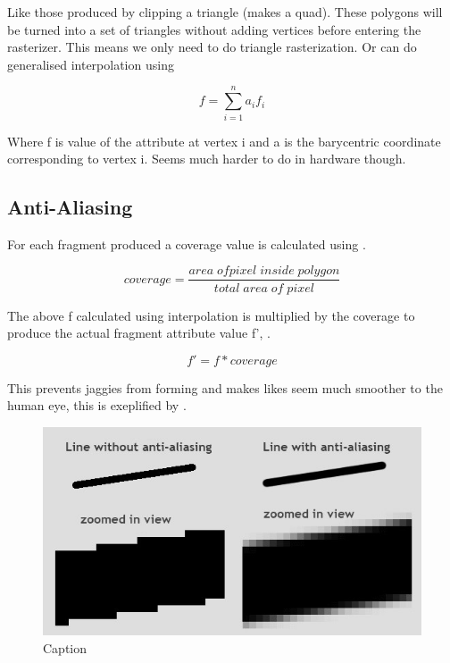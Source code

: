 Like those produced by clipping a triangle (makes a quad). These polygons will be turned into a set of triangles without adding vertices before entering the rasterizer. This means we only need to do triangle rasterization.
Or can do generalised interpolation using 

\begin{equation}\label{eqn:generalisedInterpolation}
    f = \sum_{i=1}^{n} a_if_i
\end{equation}

Where f is value of the attribute at vertex i and a is the barycentric coordinate corresponding to vertex i. 
Seems much harder to do in hardware though.

\subsection{Anti-Aliasing}
For each fragment produced a coverage value is calculated using .

\begin{equation}\label{eqn:aa-coverage}
    coverage = \frac{area \; of pixel \; inside \; polygon}{total \; area \; of \; pixel}
\end{equation}

The above f calculated using interpolation is multiplied by the coverage to produce the actual fragment attribute value f’, .

\begin{equation}\label{eqn:interpolatedValueAfterAA}
    f' = f * coverage
\end{equation}

This prevents jaggies\cite{jaggiesExplanation} from forming and makes likes seem much smoother to the human eye, this is exeplified by .

\begin{figure}[ht]
    \centering
    \includegraphics{lit_review/images/BeforeAndAfterAntiAliasing.jpg}
    \caption{Caption\cite{aaDiagram}}
    \label{fig:AAbeforeAndAfter}
\end{figure}